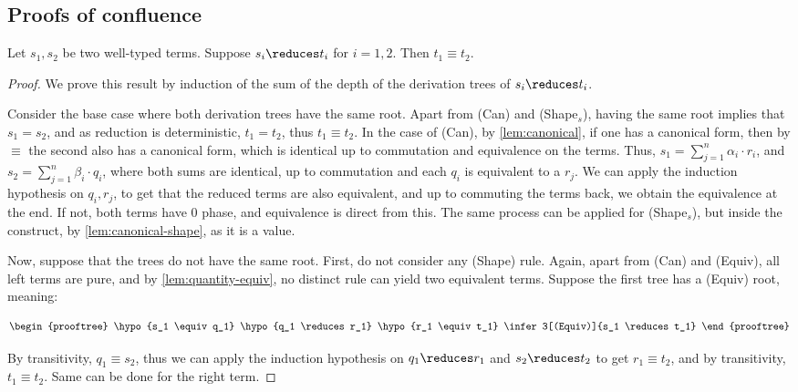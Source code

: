 \subsection{Proofs of confluence}

\begin{lemma}
  \label{lem:confluence-equiv}
  Let $s_1, s_2$ be two well-typed terms.
  Suppose $s_i \reduces t_i$ for $i = 1, 2$.
  Then $t_1 \equiv t_2$.
\end{lemma}

\begin{proof}
  We prove this result by induction of the sum
  of the depth of the derivation trees of $s_i \reduces t_i$.

  Consider the base case where both derivation trees have the
  same root. Apart from (Can) and (Shape$_s$), having the
  same root implies that $s_1 = s_2$, and as reduction is
  deterministic, $t_1 = t_2$, thus $t_1 \equiv t_2$.
  In the case of (Can), by \autoref{lem:canonical}, if one has
  a canonical form, then by $\equiv$ the second also has a canonical
  form, which is identical up to commutation and equivalence on the terms.
  Thus, $s_1 = \sum_{j=1}^n \alpha_i \cdot r_i$, and
  $s_2 = \sum_{j=1}^n \beta_i \cdot q_i$, where both sums are identical,
  up to commutation and each $q_i$ is equivalent to a $r_j$.
  We can apply the induction hypothesis on $q_i, r_j$, to get that the
  reduced terms are also equivalent, and up to commuting the terms back,
  we obtain the equivalence at the end. If not, both terms have
  $0$ phase, and equivalence is direct from this.
  The same process can be applied for (Shape$_s$), but inside the
  \textshape{} construct, by \autoref{lem:canonical-shape}, as it is a value.

  Now, suppose that the trees do not have the same root.
  First, do not consider any (Shape) rule. Again, apart from (Can) and (Equiv),
  all left terms are pure, and by \autoref{lem:quantity-equiv},
  no distinct rule can yield two equivalent terms.
  Suppose the first tree has a (Equiv) root, meaning:

  \[
    \begin{prooftree}
      \hypo{s_1 \equiv q_1}
      \hypo{q_1 \reduces r_1}
      \hypo{r_1 \equiv t_1}
      \infer3[(Equiv)]{s_1 \reduces t_1}
    \end{prooftree}
  \]

  By transitivity, $q_1 \equiv s_2$, thus we can apply the induction hypothesis
  on $q_1 \reduces r_1$ and $s_2 \reduces t_2$ to get $r_1 \equiv t_2$,
  and by transitivity, $t_1 \equiv t_2$.
  Same can be done for the right term.


\end{proof}
